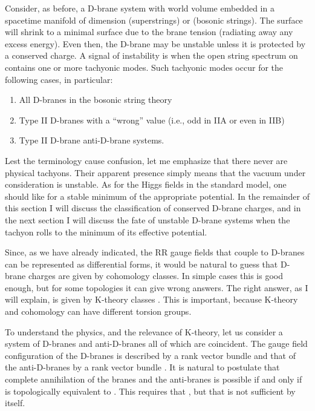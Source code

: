 \documentclass[a4paper,12pt]{article}
\begin{document}
Consider, as before, a D-brane system with world volume \coordHE{}
embedded in a spacetime manifold \coordHE{} of dimension \coordHE{}
(superstrings) or \coordHE{} (bosonic strings).  The surface \coordHE{}
will shrink to a minimal surface due to the brane tension
(radiating away any excess energy).  Even then, the D-brane may be
unstable unless it is protected by a conserved charge.  A signal
of instability is when the open string spectrum on \coordHE{} contains
one or more tachyonic modes. Such tachyonic modes occur for the
following cases, in particular:
\begin{enumerate}
\item All D-branes in the \coordHE{} bosonic string theory
\item Type II D\coordHE{}-branes with a ``wrong'' \coordHE{} value (i.e., \coordHE{} odd in IIA or \coordHE{}
even in IIB)
\item Type II D-brane \myHighlight{$+$}\coordHE{} anti-D-brane systems.
\end{enumerate}
Lest the terminology cause confusion, let me emphasize that there
never are physical tachyons. Their apparent presence simply means
that the vacuum under consideration is unstable. As for the Higgs
fields in the standard model, one should like for a stable minimum
of the appropriate potential. In the remainder of this section I
will discuss the classification of conserved D-brane charges, and
in the next section I will discuss the fate of unstable D-brane
systems when the tachyon rolls to the minimum of its effective
potential.

Since, as we have already indicated, the RR gauge fields that
couple to D-branes can be represented as differential forms, it
would be natural to guess that D-brane charges are given by
cohomology classes.  In simple cases this is good enough, but for
some topologies it can give wrong answers.  The right answer, as I
will explain, is given by K-theory classes \cite{MM, W2}. This is important,
because K-theory and cohomology can have different torsion groups.

To understand the physics, and the relevance of K-theory, let us
consider a system of \coordHE{} D\coordHE{}-branes and \coordHE{} anti-D\coordHE{}-branes all
of which are coincident. The gauge field configuration of the
D-branes is described by a rank \coordHE{} vector bundle \coordHE{} and that of
the anti-D-branes by a rank \coordHE{} vector bundle \coordHE{}. It is natural
to postulate that complete annihilation of the branes and the
anti-branes is possible if and only if \coordHE{} is topologically
equivalent to \coordHE{}. This requires that \coordHE{}, but that is not
sufficient by itself.
\end{document}
